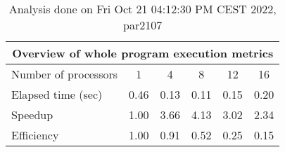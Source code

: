 \begin{table}[h]
\begin{center}
\begin{tabular}{|l|c|c|c|c|c|}
\hline
\multicolumn{6}{|c|}{Overview of whole program execution metrics} \\
\hline
\hline
Number of processors & 1 & 4 & 8 & 12 & 16 \\
\hline
Elapsed time (sec)      &       0.46 &       0.13 &       0.11 &       0.15 &       0.20 \\
\hline
Speedup                 &       1.00 &       3.66 &       4.13 &       3.02 &       2.34 \\
\hline
Efficiency              &       1.00 &       0.91 &       0.52 &       0.25 &       0.15 \\
\hline
\end{tabular}
\end{center}
\caption{ Analysis done on Fri Oct 21 04:12:30 PM CEST 2022, par2107}
\end{table}
